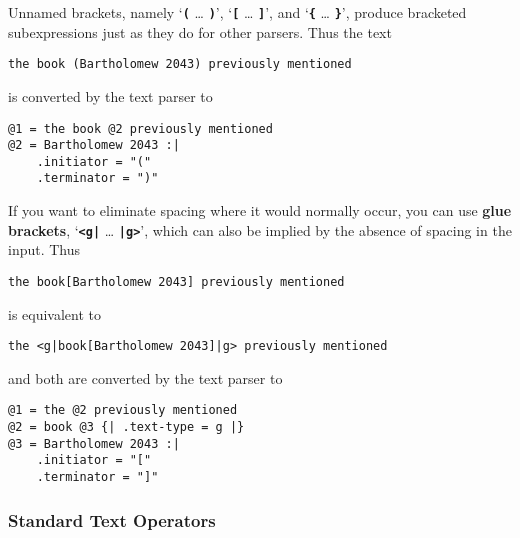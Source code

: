 \documentclass[12pt]{article}
\newcommand{\TT}[1]{{\tt \bfseries #1}}
\newcommand{\key}[1]{{\rm \bfseries #1}}
\newenvironment{indpar}[1][0.3in]%
	{\begin{list}{}%
		     {\setlength{\itemsep}{0in}%
		      \setlength{\topsep}{0in}%
		      \setlength{\parsep}{1ex}%
		      \setlength{\labelwidth}{#1}%
		      \setlength{\leftmargin}{#1}%
		      \addtolength{\leftmargin}{\labelsep}}%
	 \item}%
	{\end{list}}
\begin{document}
Unnamed brackets, namely
`\TT{(} \ldots{} \TT{)}',
`\TT{[} \ldots{} \TT{]}', and
`\TT{\{} \ldots{} \TT{\}}',
produce bracketed subexpressions just as they do for other
parsers.  Thus the text

\begin{indpar}\begin{verbatim}
the book (Bartholomew 2043) previously mentioned
\end{verbatim}\end{indpar}

is converted by the text parser to

\begin{indpar}\begin{verbatim}
@1 = the book @2 previously mentioned
@2 = Bartholomew 2043 :|
    .initiator = "("
    .terminator = ")"
\end{verbatim}\end{indpar}

If you want to eliminate spacing where it would normally occur,
you can use \key{glue brackets}, `\TT{<g|} \ldots{} \TT{|g>}',
which can also be implied by the absence of spacing in the input.
Thus

\begin{indpar}\begin{verbatim}
the book[Bartholomew 2043] previously mentioned
\end{verbatim}\end{indpar}

is equivalent to

\begin{indpar}\begin{verbatim}
the <g|book[Bartholomew 2043]|g> previously mentioned
\end{verbatim}\end{indpar}

and both are converted by the text parser to

\begin{indpar}\begin{verbatim}
@1 = the @2 previously mentioned
@2 = book @3 {| .text-type = g |}
@3 = Bartholomew 2043 :|
    .initiator = "["
    .terminator = "]"
\end{verbatim}\end{indpar}

\subsubsection{Standard Text Operators}
\label{STANDARD-TEXT-OPERATORS}
\end{document}
